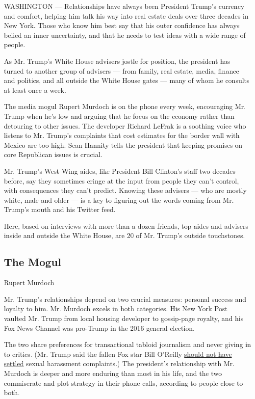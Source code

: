 WASHINGTON --- Relationships have always been President Trump's currency
and comfort, helping him talk his way into real estate deals over three
decades in New York. Those who know him best say that his outer
confidence has always belied an inner uncertainty, and that he needs to
test ideas with a wide range of people.

As Mr. Trump's White House advisers jostle for position, the president
has turned to another group of advisers --- from family, real estate,
media, finance and politics, and all outside the White House gates ---
many of whom he consults at least once a week.

The media mogul Rupert Murdoch is on the phone every week, encouraging
Mr. Trump when he's low and arguing that he focus on the economy rather
than detouring to other issues. The developer Richard LeFrak is a
soothing voice who listens to Mr. Trump's complaints that cost estimates
for the border wall with Mexico are too high. Sean Hannity tells the
president that keeping promises on core Republican issues is crucial.

Mr. Trump's West Wing aides, like President Bill Clinton's staff two
decades before, say they sometimes cringe at the input from people they
can't control, with consequences they can't predict. Knowing these
advisers --- who are mostly white, male and older --- is a key to
figuring out the words coming from Mr. Trump's mouth and his Twitter
feed.

Here, based on interviews with more than a dozen friends, top aides and
advisers inside and outside the White House, are 20 of Mr. Trump's
outside touchstones.

\hypertarget{the-mogul}{%
\subsection{The Mogul}\label{the-mogul}}

Rupert Murdoch

Mr. Trump's relationships depend on two crucial measures: personal
success and loyalty to him. Mr. Murdoch excels in both categories. His
New York Post vaulted Mr. Trump from local housing developer to
gossip-page royalty, and his Fox News Channel was pro-Trump in the 2016
general election.

The two share preferences for transactional tabloid journalism and never
giving in to critics. (Mr. Trump said the fallen Fox star Bill O'Reilly
\href{https://www.nytimes3xbfgragh.onion/2017/04/05/business/media/trump-oreilly-fox-murdochs.html}{should
not have settled} sexual harassment complaints.) The president's
relationship with Mr. Murdoch is deeper and more enduring than most in
his life, and the two commiserate and plot strategy in their phone
calls, according to people close to both.

